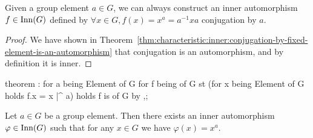 \begin{corollary}\label{thm:characteristic:inner:conjugation-as-endomorphism-is-inner-automorphism}
Given a group element $a\in G$, we can always construct an
inner automorphism $f\in\operatorname{Inn}(G)$ defined by
$\forall x\in G,f(x)=x^{a}=a^{-1}xa$ conjugation by $a$.
\end{corollary}

\begin{proof}
We have shown in Theorem~\ref{thm:characteristic:inner:conjugation-by-fixed-element-is-an-automorphism} that conjugation is an automorphism, and by
definition it is inner.
\end{proof}

\nwenddocs{}\endmoddef\nwstartdeflinemarkup{}\nwenddeflinemarkup
theorem :
  for a being Element of G
  for f being  of G
  st (for x being Element of G holds f.x = x |^ a)
  holds f is   of G by ,;
\eatline
{}\nwendcode{}\nwdocspar
\begin{theorem}
Let $a\in G$ be a group element. Then there exists an inner automorphism
$\varphi\in\operatorname{Inn}(G)$ such that for any $x\in G$ we have $\varphi(x)=x^{a}$.
\end{theorem}

